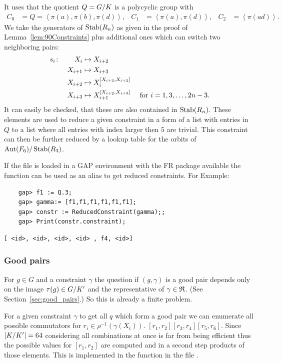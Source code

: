 \documentclass[a4paper,11pt]{amsart}
\begin{document}
It uses that the quotient $Q={G/K}$ is a polycyclic group with 
\begin{align*}
 C_0 &= Q = \left<\pi(a),\pi(b),\pi(d)\right>, &
 C_1 &= \left<\pi(a),\pi(d)\right>, &
 C_2 &= \left<\pi(ad)\right>.
\end{align*}
We take the generators of $\operatorname{Stab}(R_n)$ as given in the proof of Lemma~\ref{lem:90Constraints}
plus additional ones which can switch two neighboring pairs:
\begin{align*}
 s_i &\colon &X_i&\mapsto X_{i+2}&\\
	    &&X_{i+1}&\mapsto X_{i+3}&\\
	    &&X_{i+2}&\mapsto X_{i}^{[X_{i+2},X_{i+3}]}&\\
	    &&X_{i+3}&\mapsto X_{i+1}^{[X_{i+2},X_{i+3}]} & \textup{ for }i = 1,3,\dotsc,2n-3.
\end{align*}
It can easily be checked, that these are also contained in $\operatorname{Stab}(R_n)$. These elements
are used to reduce a given constraint in a form of a list with entries in $Q$ to a
list where all entries with index larger then $5$ are trivial. 
This constraint can then be further reduced by a lookup table for the orbits
of ${\operatorname{{Aut}}(F_6)/\operatorname{Stab}(R_3)}$. 

If the file  is loaded in a GAP environment with the FR package available 
the function  can be used as an alias to get 
reduced constraints. For Example:
 \begin{lstlisting}
    gap> f1 := Q.3;
    gap> gamma:= [f1,f1,f1,f1,f1,f1];
    gap> constr := ReducedConstraint(gamma);;
    gap> Print(constr.constraint);
\end{lstlisting} 
\begin{verbatim}
[ <id>, <id>, <id>, <id> , f4, <id>]
\end{verbatim} 

\subsubsection{Good pairs}
For $g\in G$ and a constraint $\gamma$ the question if $(g,\gamma)$ is a good
pair depends only on the image $\tau(g)\in{G/K'}$ and the representative
of $\gamma\in\mathfrak{R}$. (See Section~\ref{sec:good_pairs}.) So this is already a
finite problem. 

For a given constraint $\gamma$ to get all $q$ which form a good pair we can
enumerate all possible commutators for $r_i\in\rho^{-1}(\gamma(X_i))$.
$[r_1,r_2][r_3,r_4][r_5,r_6]$. Since $\lvert{K/K'}\rvert=64$ considering all 
combinations at once is far from being efficient thus the possible values for
$[r_1,r_2]$ are computed and in a second step products of those elements.
This is implemented in the function  in the file
.
\end{document}
